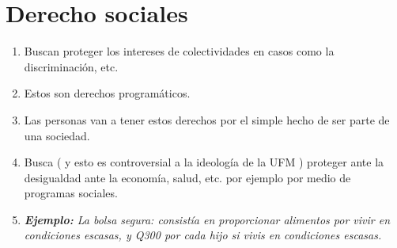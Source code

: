 \section{Derecho sociales}
\begin{enumerate}
    \item Buscan proteger los intereses de colectividades en casos como la discriminación, etc.
    \item Estos son derechos programáticos.
    \item Las personas van a tener estos derechos por el simple hecho de ser parte de una sociedad.
    \item Busca ( y esto es controversial a la ideología de la UFM ) proteger ante la desigualdad ante la economía, salud, etc. por ejemplo por medio de programas sociales.
    \item \emph{\textbf{Ejemplo: }La bolsa segura: consistía en proporcionar alimentos por vivir en condiciones escasas, y Q300 por cada hijo si vivis en condiciones escasas.}
\end{enumerate}
